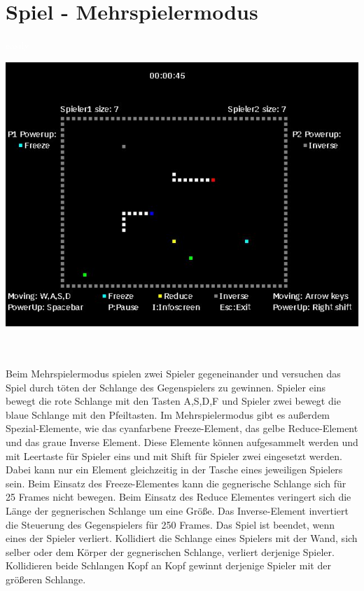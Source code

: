 \section{Spiel - Mehrspielermodus}
\label{Spiel_-_Mehrspielermodus}
%
\textcolor{white}{easily}
\newline 
\begin{minipage}[X]{1.0\textwidth}
 \centering
 \includegraphics[scale=0.5]{bilder/Mehrspielermodus}
 \label{fig:mehrspielermodus}
\end{minipage}
\\ \\ 
	Beim Mehrspielermodus spielen zwei Spieler gegeneinander und versuchen das Spiel durch töten der Schlange des Gegenspielers zu gewinnen. Spieler eins bewegt die rote Schlange mit den Tasten A,S,D,F und Spieler zwei bewegt die blaue Schlange mit den Pfeiltasten. Im Mehrspielermodus gibt es außerdem Spezial-Elemente, wie das cyanfarbene Freeze-Element, das gelbe Reduce-Element und das graue Inverse Element. Diese Elemente können aufgesammelt werden und mit Leertaste für Spieler eins und mit Shift für Spieler zwei eingesetzt werden. Dabei kann nur ein Element gleichzeitig in der Tasche eines jeweiligen Spielers sein. Beim Einsatz des Freeze-Elementes kann die gegnerische Schlange sich für 25 Frames nicht bewegen. Beim Einsatz des Reduce Elementes veringert sich die Länge der gegnerischen Schlange um eine Größe. Das Inverse-Element invertiert die Steuerung des Gegenspielers für 250 Frames. Das Spiel ist beendet, wenn eines der Spieler verliert. Kollidiert die Schlange eines Spielers mit der Wand, sich selber oder dem Körper der gegnerischen Schlange, verliert derjenige Spieler. Kollidieren beide Schlangen Kopf an Kopf gewinnt derjenige Spieler mit der größeren Schlange.  

